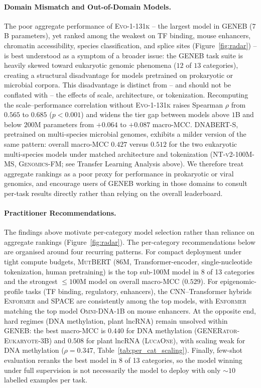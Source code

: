 \documentclass{llmxive}
\begin{document}
\paragraph{Domain Mismatch and Out-of-Domain Models.}
The poor aggregate performance of \textsc{Evo-1-131k} -- the largest
model in GENEB ($7$B parameters), yet ranked among the weakest on TF binding, mouse enhancers,
chromatin accessibility, species classification, and splice sites
(Figure~\ref{fig:radar}) -- is best understood as a symptom of a broader issue: the GENEB task suite is heavily skewed toward eukaryotic genomic phenomena
($12$ of $13$ categories), creating a structural disadvantage for
models pretrained on prokaryotic or microbial corpora. This disadvantage is distinct from -- and should
not be conflated with -- the effects of scale, architecture, or
tokenization. Recomputing the scale--performance correlation without \textsc{Evo-1-131k}
raises Spearman $\rho$ from $0.565$ to $0.685$ ($p<0.001$) and widens
the tier gap between models above $1$B and below $200$M parameters
from $+0.064$ to $+0.087$ macro-MCC.
\textsc{DNABERT-S}, pretrained on multi-species microbial genomes,
exhibits a milder version of the same pattern: overall macro-MCC
$0.427$ versus $0.512$ for the two eukaryotic multi-species models
under matched architecture and tokenization
(\textsc{NT-v2-100M-MS}, \textsc{Genomics-FM}; see Transfer Learning
Analysis above). We therefore treat aggregate rankings as a poor
proxy for performance in prokaryotic or viral genomics, and
encourage users of GENEB working in those domains to consult
per-task results directly rather than relying on the overall
leaderboard.

\paragraph{Practitioner Recommendations.}
The findings above motivate per-category model selection rather than
reliance on aggregate rankings (Figure~\ref{fig:radar}). The
per-category recommendations below are organised around four
recurring patterns. For compact deployment under tight compute
budgets, \textsc{MutBERT} (86M, Transformer-encoder, single-nucleotide
tokenization, human pretraining) is the top sub-100M model in 8 of 13
categories and the strongest $\le 100$M model on overall macro-MCC
($0.529$). For epigenomic-profile tasks (TF binding, regulatory,
enhancers), the CNN--Transformer hybrids \textsc{Enformer} and
\textsc{SPACE} are consistently among the top models, with
\textsc{Enformer} matching the top model \textsc{Omni-DNA-1B}
on mouse enhancers. At the opposite end, hard
regimes (DNA methylation, plant lncRNA) remain unsolved within GENEB:
the best macro-MCC is $0.440$ for DNA methylation
(\textsc{GENERator-Eukaryote-3B}) and $0.508$ for plant lncRNA
(\textsc{LucaOne}), with scaling weak for DNA methylation ($\rho=0.347$,
Table~\ref{tab:per_cat_scaling}). Finally, few-shot evaluation
reranks the best model in 8 of 13 categories, so the model winning
under full supervision is not necessarily the model to deploy with
only $\sim 10$ labelled examples per task.
\end{document}
